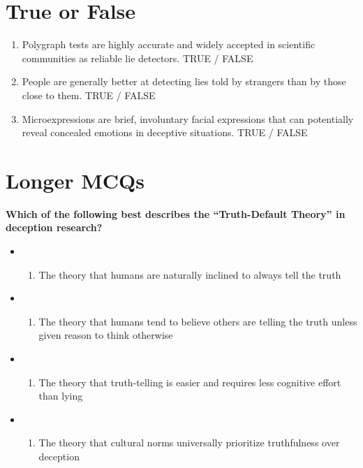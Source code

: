 \documentclass[
  letterpaper,
  DIV=11,
  numbers=noendperiod]{scrreprt}
\providecommand{\tightlist}{%
  \setlength{\itemsep}{0pt}\setlength{\parskip}{0pt}}\usepackage{longtable,booktabs,array}
\begin{document}
\section{True or False}\label{true-or-false}

\begin{enumerate}
\def\labelenumi{\arabic{enumi}.}
\item
  Polygraph tests are highly accurate and widely accepted in scientific
  communities as reliable lie detectors. TRUE / FALSE
\item
  People are generally better at detecting lies told by strangers than
  by those close to them. TRUE / FALSE
\item
  Microexpressions are brief, involuntary facial expressions that can
  potentially reveal concealed emotions in deceptive situations. TRUE /
  FALSE
\end{enumerate}

\section{Longer MCQs}\label{longer-mcqs}

\textbf{Which of the following best describes the ``Truth-Default
Theory'' in deception research?}

\begin{itemize}
\tightlist
\item
  \begin{enumerate}
  \def\labelenumi{(\Alph{enumi})}
  \tightlist
  \item
    The theory that humans are naturally inclined to always tell the
    truth\\
  \end{enumerate}
\item
  \begin{enumerate}
  \def\labelenumi{(\Alph{enumi})}
  \setcounter{enumi}{1}
  \tightlist
  \item
    The theory that humans tend to believe others are telling the truth
    unless given reason to think otherwise\\
  \end{enumerate}
\item
  \begin{enumerate}
  \def\labelenumi{(\Alph{enumi})}
  \setcounter{enumi}{2}
  \tightlist
  \item
    The theory that truth-telling is easier and requires less cognitive
    effort than lying\\
  \end{enumerate}
\item
  \begin{enumerate}
  \def\labelenumi{(\Alph{enumi})}
  \setcounter{enumi}{3}
  \tightlist
  \item
    The theory that cultural norms universally prioritize truthfulness
    over deception
  \end{enumerate}
\end{itemize}
\end{document}
